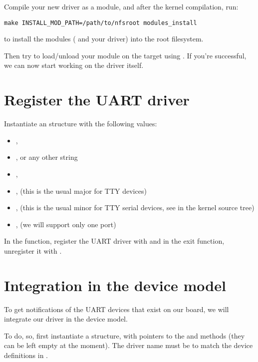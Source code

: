 Compile your new driver as a module, and after the kernel compilation, run:

\begin{verbatim}
make INSTALL_MOD_PATH=/path/to/nfsroot modules_install
\end{verbatim}

to install the modules ( and your driver) into the
root filesystem.

Then try to load/unload your module on the target
using . If you're successful, we can now start working
on the driver itself.

\section{Register the UART driver}

Instantiate an  structure with the following values:

\begin{itemize}
\item {}, 
\item {},  or any other string
\item {}, 
\item {},  (this is the usual major for TTY devices)
\item {},  (this is the usual minor for TTY serial
  devices, see  in the kernel source tree)
\item {},  (we will support only one port)
\end{itemize}

In the  function, register the UART driver with
 and in the exit function,
unregister it with .

\section{Integration in the device model}

To get notifications of the UART devices that exist on our board, we
will integrate our driver in the device model.

To do, so, first instantiate a  structure, with
pointers to the  and  methods (they can
be left empty at the moment). The driver name must be
 to match the device definitions in
.

